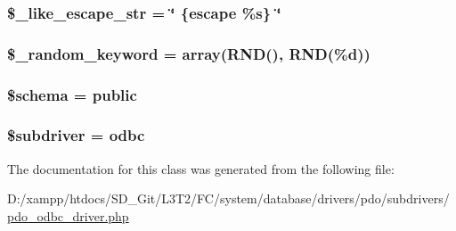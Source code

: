 \subsubsection[{\$\+\_\+like\+\_\+escape\+\_\+str}]{\setlength{\rightskip}{0pt plus 5cm}\$\+\_\+like\+\_\+escape\+\_\+str = \char`\"{} \{escape \textquotesingle{}\%s\textquotesingle{}\} \char`\"{}\hspace{0.3cm}{\ttfamily [protected]}}\label{class_c_i___d_b__pdo__odbc__driver_adf86ecadf3d0e1ce3f5e0eaeeb3867ae}
\hypertarget{class_c_i___d_b__pdo__odbc__driver_a10213aa6e05f6d924d3277bb1d2fea00}{}
\subsubsection[{\$\+\_\+random\+\_\+keyword}]{\setlength{\rightskip}{0pt plus 5cm}\$\+\_\+random\+\_\+keyword = array(\textquotesingle{}R\+N\+D()\textquotesingle{}, \textquotesingle{}R\+N\+D(\%{\bf d})\textquotesingle{})\hspace{0.3cm}{\ttfamily [protected]}}\label{class_c_i___d_b__pdo__odbc__driver_a10213aa6e05f6d924d3277bb1d2fea00}
\hypertarget{class_c_i___d_b__pdo__odbc__driver_a83022b1d70799d2bde3d64dca9cb40ee}{}
\subsubsection[{\$schema}]{\setlength{\rightskip}{0pt plus 5cm}\$schema = \textquotesingle{}public\textquotesingle{}}\label{class_c_i___d_b__pdo__odbc__driver_a83022b1d70799d2bde3d64dca9cb40ee}
\hypertarget{class_c_i___d_b__pdo__odbc__driver_a1322ca756348b11d080cb7a4f590de15}{}
\subsubsection[{\$subdriver}]{\setlength{\rightskip}{0pt plus 5cm}\$subdriver = \textquotesingle{}odbc\textquotesingle{}}\label{class_c_i___d_b__pdo__odbc__driver_a1322ca756348b11d080cb7a4f590de15}


The documentation for this class was generated from the following file\+:\begin{DoxyCompactItemize}
\item 
D\+:/xampp/htdocs/\+S\+D\+\_\+\+Git/\+L3\+T2/\+F\+C/system/database/drivers/pdo/subdrivers/\hyperlink{pdo__odbc__driver_8php}{pdo\+\_\+odbc\+\_\+driver.\+php}\end{DoxyCompactItemize}
